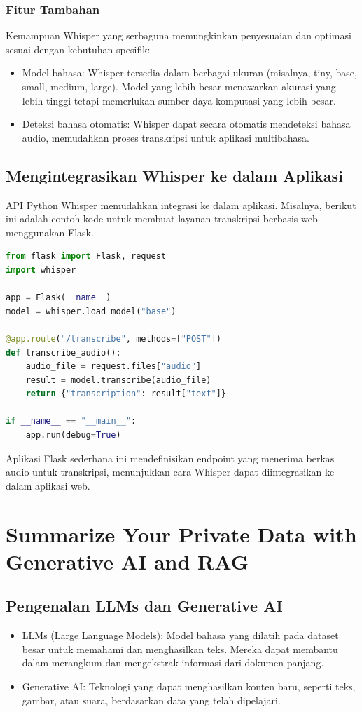 \documentclass{article}
\begin{document}
\subsubsection{Fitur Tambahan}
Kemampuan Whisper yang serbaguna memungkinkan penyesuaian dan optimasi sesuai dengan kebutuhan spesifik:
\begin{itemize}
    \item Model bahasa: Whisper tersedia dalam berbagai ukuran (misalnya, tiny, base, small, medium, large). Model yang lebih besar menawarkan akurasi yang lebih tinggi tetapi memerlukan sumber daya komputasi yang lebih besar.
    \item Deteksi bahasa otomatis: Whisper dapat secara otomatis mendeteksi bahasa audio, memudahkan proses transkripsi untuk aplikasi multibahasa.
\end{itemize}

\subsection{Mengintegrasikan Whisper ke dalam Aplikasi}
API Python Whisper memudahkan integrasi ke dalam aplikasi. Misalnya, berikut ini adalah contoh kode untuk membuat layanan transkripsi berbasis web menggunakan Flask.
\begin{lstlisting}[language=Python, caption={}, captionpos=b]
from flask import Flask, request
import whisper

app = Flask(__name__)
model = whisper.load_model("base")

@app.route("/transcribe", methods=["POST"])
def transcribe_audio():
    audio_file = request.files["audio"]
    result = model.transcribe(audio_file)
    return {"transcription": result["text"]}

if __name__ == "__main__":
    app.run(debug=True)
\end{lstlisting}

Aplikasi Flask sederhana ini mendefinisikan endpoint yang menerima berkas audio untuk transkripsi, menunjukkan cara Whisper dapat diintegrasikan ke dalam aplikasi web.


\newpage

\section{Summarize Your Private Data with Generative AI and RAG}
\subsection{Pengenalan LLMs dan Generative AI}
\begin{itemize}
    \item LLMs (Large Language Models): Model bahasa yang dilatih pada dataset besar untuk memahami dan menghasilkan teks. Mereka dapat membantu dalam merangkum dan mengekstrak informasi dari dokumen panjang.
    \item Generative AI: Teknologi yang dapat menghasilkan konten baru, seperti teks, gambar, atau suara, berdasarkan data yang telah dipelajari.
\end{itemize}
\end{document}
